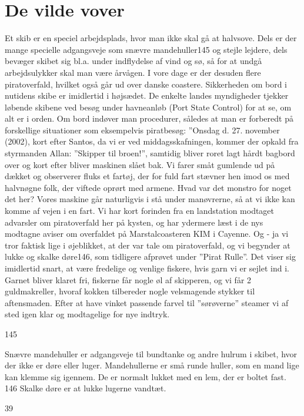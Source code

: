 \chapter{De vilde vover}\label{de-vilde-vover}

Et skib er en speciel arbejdsplads, hvor man ikke skal gå at halvsove.
Dels er der mange specielle adgangsveje som snævre mandehuller145 og
stejle lejdere, dels bevæger skibet sig bl.a. under indflydelse af vind
og sø, så for at undgå arbejdsulykker skal man være årvågen. I vore dage
er der desuden flere piratoverfald, hvilket også går ud over danske
coastere. Sikkerheden om bord i nutidens skibe er imidlertid i højsædet.
De enkelte landes myndigheder tjekker løbende skibene ved besøg under
havneanløb (Port State Control) for at se, om alt er i orden. Om bord
indøver man procedurer, således at man er forberedt på forskellige
situationer som eksempelvis piratbesøg: ''Onsdag d. 27. november (2002),
kort efter Santos, da vi er ved middagsskafningen, kommer der opkald fra
styrmanden Allan: ''Skipper til broen!'', samtidig bliver roret lagt
hårdt bagbord over og kort efter bliver maskinen slået bak. Vi farer
småt gumlende ud på dækket og observerer fluks et fartøj, der for fuld
fart stævner hen imod os med halvnøgne folk, der viftede oprørt med
armene. Hvad var det monstro for noget det her? Vores maskine går
naturligvis i stå under manøvrerne, så at vi ikke kan komme af vejen i
en fart. Vi har kort forinden fra en landstation modtaget advarsler om
piratoverfald her på kysten, og har ydermere læst i de nys modtagne
aviser om overfaldet på Marstalcoasteren KIM i Cayenne. Og - ja vi tror
faktisk lige i øjeblikket, at der var tale om piratoverfald, og vi
begynder at lukke og skalke døre146, som tidligere afprøvet under
''Pirat Rulle''. Det viser sig imidlertid snart, at være fredelige og
venlige fiskere, hvis garn vi er sejlet ind i. Garnet bliver klaret fri,
fiskerne får nogle øl af skipperen, og vi får 2 guldmakreller, hvoraf
kokken tilbereder nogle velsmagende stykker til aftensmaden. Efter at
have vinket passende farvel til ''sørøverne'' steamer vi af sted igen
klar og modtagelige for nye indtryk.

145

Snævre mandehuller er adgangsveje til bundtanke og andre hulrum i
skibet, hvor der ikke er døre eller luger. Mandehullerne er små runde
huller, som en mand lige kan klemme sig igennem. De er normalt lukket
med en lem, der er boltet fast. 146 Skalke døre er at lukke lugerne
vandtæt.

39

